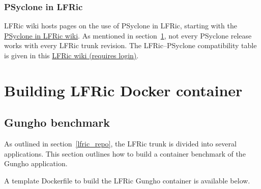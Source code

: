 \documentclass[twoside,a4paper,12pt]{article}
\begin{document}
\subsubsection{PSyclone in LFRic}\label{psyclone_lfric}

LFRic wiki hosts pages on the use of PSyclone in LFRic, starting with the
\href{https://code.metoffice.gov.uk/trac/lfric/wiki/PSycloneTool}{PSyclone in LFRic wiki}.
As mentioned in section~\ref{lfric_docker}, not every PSyclone release works
with every LFRic trunk revision. The LFRic--PSyclone compatibility table is
given in this
\href{https://code.metoffice.gov.uk/trac/lfric/wiki/LFRicTechnical/VersionsCompatibility}{LFRic wiki (requires login)}.
%
%
\section{Building LFRic Docker container}\label{lfric_docker}
%
%
\subsection{Gungho benchmark}\label{gungho_benchmark}

As outlined in section~\ref{lfric_repo}, the LFRic trunk is divided into
several applications. This section outlines how to build a container benchmark
of the Gungho application.

A template Dockerfile to build the LFRic Gungho container is available below.
\end{document}
